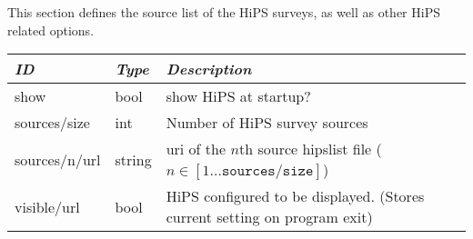 This section defines the source list of the HiPS surveys, as well as other
HiPS related options.

\noindent%
\begin{tabularx}{\textwidth}{l|l|X}\toprule
\emph{ID}     & \emph{Type} & \emph{Description}\\\midrule
show          & bool        & show HiPS at startup? \\
sources/size  & int         & Number of HiPS survey sources\\%
sources/n/url & string      & uri of the $n$th source hipslist file ($n \in [1 \ldots \mathtt{sources/size}]$)\\
visible/url   & bool        & HiPS configured to be displayed. (Stores current setting on program exit)\\\bottomrule
\end{tabularx}



